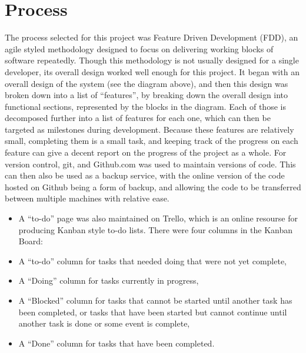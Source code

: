 \section{Process}
The process selected for this project was Feature Driven Development (FDD), an agile styled methodology designed to focus on delivering working blocks of software repeatedly. Though this methodology is not usually designed for a single developer, its overall design worked well enough for this project. It began with an overall design of the system (see the diagram above), and then this design was broken down into a list of “features”, by breaking down the overall design into functional sections, represented by the blocks in the diagram. Each of those is decomposed further into a list of features for each one, which can then be targeted as milestones during development. Because these features are relatively  small, completing them is a small task, and keeping track of the progress on each feature can give a decent report on the progress of the project as a whole.
For version control, git, and Github.com was used to maintain versions of code. This can then also be used as a backup service, with the online version of the code hosted on Github being a form of backup, and allowing the code to be transferred between multiple machines with relative ease.
\begin{itemize}
	\item A “to-do” page was also maintained on Trello, which is an online resourse for producing Kanban style to-do lists. There were four columns in the Kanban Board: 
	\item A “to-do” column for tasks that needed doing that were not yet complete, 
	\item A  “Doing” column for tasks currently in progress, 
	\item A “Blocked” column for tasks that cannot be started until another task has been completed, or tasks that have been started but cannot continue until another task is done or some event is complete,
\item A “Done” column for tasks that have been completed.
\end{itemize}